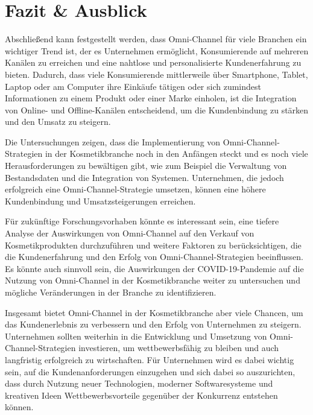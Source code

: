\newpage
\section{Fazit \& Ausblick}\label{hauptabschnitt_6}

Abschließend kann festgestellt werden, dass Omni-Channel für viele Branchen ein wichtiger Trend ist, der es Unternehmen ermöglicht, Konsumierende auf mehreren Kanälen zu erreichen und eine nahtlose und personalisierte Kundenerfahrung zu bieten. Dadurch, dass viele Konsumierende mittlerweile über Smartphone, Tablet, Laptop oder am Computer ihre Einkäufe tätigen oder sich zumindest Informationen zu einem Produkt oder einer Marke einholen, ist die Integration von Online- und Offline-Kanälen entscheidend, um die Kundenbindung zu stärken und den Umsatz zu steigern.
\newline

Die Untersuchungen zeigen, dass die Implementierung von Omni-Channel-Strategien in der Kosmetikbranche noch in den Anfängen steckt und es noch viele Herausforderungen zu bewältigen gibt, wie zum Beispiel die Verwaltung von Bestandsdaten und die Integration von Systemen. Unternehmen, die jedoch erfolgreich eine Omni-Channel-Strategie umsetzen, können eine höhere Kundenbindung und Umsatzsteigerungen erreichen.
\newline

Für zukünftige Forschungsvorhaben könnte es interessant sein, eine tiefere Analyse der Auswirkungen von Omni-Channel auf den Verkauf von Kosmetikprodukten durchzuführen und weitere Faktoren zu berücksichtigen, die die Kundenerfahrung und den Erfolg von Omni-Channel-Strategien beeinflussen. Es könnte auch sinnvoll sein, die Auswirkungen der COVID-19-Pandemie auf die Nutzung von Omni-Channel in der Kosmetikbranche weiter zu untersuchen und mögliche Veränderungen in der Branche zu identifizieren.
\newline

Insgesamt bietet Omni-Channel in der Kosmetikbranche aber viele Chancen, um das Kundenerlebnis zu verbessern und den Erfolg von Unternehmen zu steigern. Unternehmen sollten weiterhin in die Entwicklung und Umsetzung von Omni-Channel-Strategien investieren, um wettbewerbsfähig zu bleiben und auch langfristig erfolgreich zu wirtschaften. Für Unternehmen wird es dabei wichtig sein, auf die Kundenanforderungen einzugehen und sich dabei so auszurichten, dass durch Nutzung neuer Technologien, moderner Softwaresysteme und kreativen Ideen Wettbewerbsvorteile gegenüber der Konkurrenz entstehen können.
\newline

